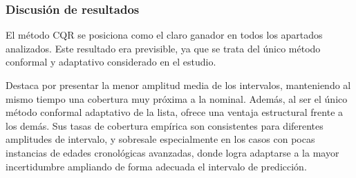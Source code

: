 

    



\subsubsection{Discusión de resultados}

El método \acrshort{CQR} se posiciona como el claro ganador en todos los apartados analizados. Este resultado era previsible, ya que se trata del único método conformal y adaptativo considerado en el estudio.

Destaca por presentar la menor amplitud media de los intervalos, manteniendo al mismo tiempo una cobertura muy próxima a la nominal. Además, al ser el único método conformal adaptativo de la lista, ofrece una ventaja estructural frente a los demás. Sus tasas de cobertura empírica son consistentes para diferentes amplitudes de intervalo, y sobresale especialmente en los casos con pocas instancias de edades cronológicas avanzadas, donde logra adaptarse a la mayor incertidumbre ampliando de forma adecuada el intervalo de predicción.

